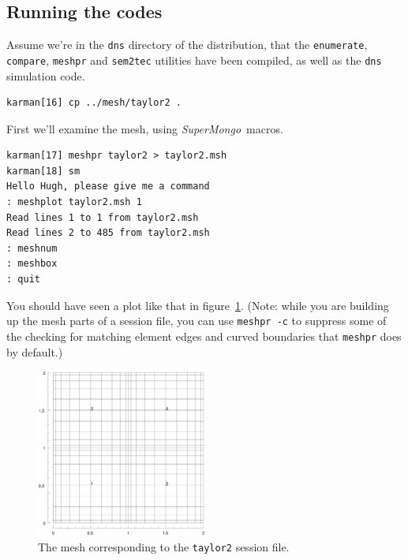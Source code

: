 \documentclass[11pt,a4paper]{report}
\newcommand{\SM}{\emph{SuperMongo}}
\begin{document}
\subsection{Running the codes}

Assume we're in the \texttt{dns} directory of the distribution, that
the \texttt{enumerate}, \texttt{compare}, \texttt{meshpr} and
\texttt{sem2tec} utilities have been compiled, as well as the
\texttt{dns} simulation code.
{\small
\begin{verbatim}
karman[16] cp ../mesh/taylor2 .
\end{verbatim}
}

First we'll examine the mesh, using \SM\ macros.
{\small
\begin{verbatim}
karman[17] meshpr taylor2 > taylor2.msh
karman[18] sm
Hello Hugh, please give me a command
: meshplot taylor2.msh 1
Read lines 1 to 1 from taylor2.msh
Read lines 2 to 485 from taylor2.msh
: meshnum
: meshbox
: quit
\end{verbatim}
}
\noindent
You should have seen a plot like that in figure~\ref{tay2msh}. (Note:
while you are building up the mesh parts of a session file, you can
use \texttt{meshpr -c} to suppress some of the checking for matching
element edges and curved boundaries that \texttt{meshpr} does by
default.)
\begin{figure}
\begin{center}
\includegraphics[width=0.5\textwidth]{taylor2mesh.eps}
\end{center}
\caption{
\label{tay2msh}
  The mesh corresponding to the \texttt{taylor2} session file.
}
\end{figure}
\end{document}
